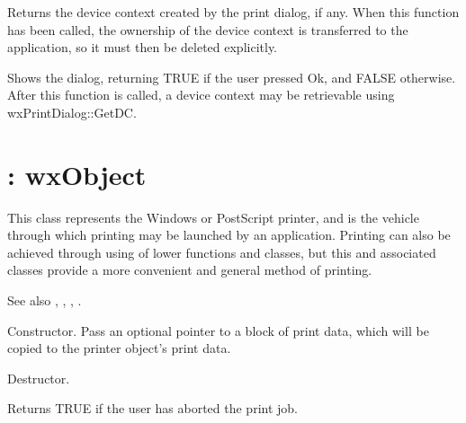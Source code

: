 
Returns the device context created by the print dialog, if any.
When this function has been called, the ownership of the device context
is transferred to the application, so it must then be deleted
explicitly.



Shows the dialog, returning TRUE if the user pressed Ok, and FALSE
otherwise. After this function is called, a device context may
be retrievable using wxPrintDialog::GetDC.

\section{: wxObject}\label{wxprinter}


This class represents the Windows or PostScript printer, and is the vehicle through
which printing may be launched by an application. Printing can also
be achieved through using of lower functions and classes, but
this and associated classes provide a more convenient and general
method of printing.

See also , ,\rtfsp
{}, .



Constructor. Pass an optional pointer to a block of print
data, which will be copied to the printer object's print data.



Destructor.



Returns TRUE if the user has aborted the print job.



